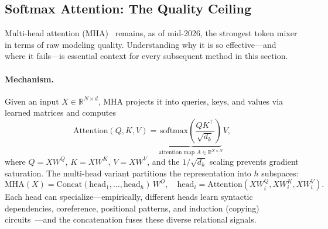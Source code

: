 \subsection{Softmax Attention: The Quality Ceiling}
\label{subsec:mha}

Multi-head attention (MHA)~\cite{vaswani2017attention} remains, as of mid-2026, the strongest token mixer in terms of raw modeling quality. Understanding why it is so effective---and where it fails---is essential context for every subsequent method in this section.

\paragraph{Mechanism.}
Given an input $X \in \mathbb{R}^{N \times d}$, MHA projects it into queries, keys, and values via learned matrices and computes
\begin{equation}
\text{Attention}(Q, K, V) = \underbrace{\text{softmax}\!\left(\frac{QK^\top}{\sqrt{d_k}}\right)}_{\text{attention map } A \in \mathbb{R}^{N \times N}} V,
\label{eq:mha}
\end{equation}
where $Q = XW^Q$, $K = XW^K$, $V = XW^V$, and the $1/\sqrt{d_k}$ scaling prevents gradient saturation. The multi-head variant partitions the representation into $h$ subspaces:
\begin{equation}
\text{MHA}(X) = \text{Concat}(\text{head}_1, \ldots, \text{head}_h)\, W^O, \quad \text{head}_i = \text{Attention}(XW_i^Q, XW_i^K, XW_i^V).
\end{equation}
Each head can specialize---empirically, different heads learn syntactic dependencies, coreference, positional patterns, and induction (copying) circuits~\cite{olsson2022context}---and the concatenation fuses these diverse relational signals.

